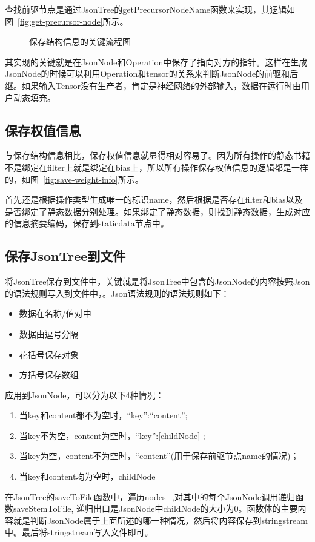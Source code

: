 查找前驱节点是通过JsonTree的getPrecursorNodeName函数来实现，其逻辑如图~\ref{fig:get-precursor-node}所示。

\begin{figure}[htb]
  \centering
  \caption{保存结构信息的关键流程图}
  \label{fig:strcut-save-key}
\end{figure}

其实现的关键就是在JsonNode和Operation中保存了指向对方的指针。这样在生成JsonNode的时候可以利用Operation和tensor的关系来判断JsonNode的前驱和后继。如果输入Tensor没有生产者，肯定是神经网络的外部输入，数据在运行时由用户动态填充。

\subsection {保存权值信息}

与保存结构信息相比，保存权值信息就显得相对容易了。因为所有操作的静态书籍不是绑定在filter上就是绑定在bias上，所以所有操作保存权值信息的逻辑都是一样的，如图~\ref{fig:save-weight-info}所示。

首先还是根据操作类型生成唯一的标识name，然后根据是否存在filter和bias以及是否绑定了静态数据分别处理。如果绑定了静态数据，则找到静态数据，生成对应的信息摘要编码，保存到staticdata节点中。

\subsection {保存JsonTree到文件}

将JsonTree保存到文件中，关键就是将JsonTree中包含的JsonNode的内容按照Json的语法规则写入到文件中，。Json语法规则的语法规则如下：
\begin{itemize}
  \item 数据在名称/值对中
  \item 数据由逗号分隔
  \item 花括号保存对象
  \item 方括号保存数组
\end{itemize}
应用到JsonNode，可以分为以下4种情况：
\begin{enumerate}
  \item 当key和content都不为空时，“key”:“content”;
  \item 当key不为空，content为空时，“key”:[childNode] ;
  \item 当key为空，content不为空时，“content”(用于保存前驱节点name的情况)；
  \item 当key和content均为空时，{childNode}
\end{enumerate}
在JsonTree的saveToFile函数中，遍历nodes\_,对其中的每个JsonNode调用递归函数saveStemToFile, 递归出口是JsonNode中childNode的大小为0。函数体的主要内容就是判断JsonNode属于上面所述的哪一种情况，然后将内容保存到stringstream中。最后将stringstream写入文件即可。

